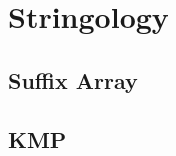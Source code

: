 \documentclass[a4paper,10pt,twocolumn,oneside]{article}
\begin{document}
\section{Stringology}
\subsection{Suffix Array}


%

\subsection{KMP}


%

%

%

%

%
\end{document}
